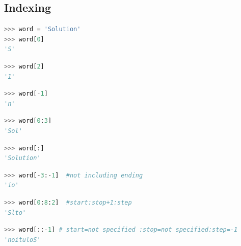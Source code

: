 \documentclass{book}
\begin{document}
    
        \subsection{Indexing}\label{indexing}
    




    
        \begin{lstlisting}[language=Python]
>>> word = 'Solution'
>>> word[0]
'S'
\end{lstlisting}
    




    
        \begin{lstlisting}[language=Python]
>>> word[2]
'1'
\end{lstlisting}
    




    
        \begin{lstlisting}[language=Python]
>>> word[-1]
'n'
\end{lstlisting}
    




    
        \begin{lstlisting}[language=Python]
>>> word[0:3]
'Sol'
\end{lstlisting}
    




    
        \begin{lstlisting}[language=Python]
>>> word[:]
'Solution'
\end{lstlisting}
    




    
        \begin{lstlisting}[language=Python]
>>> word[-3:-1]  #not including ending
'io'
\end{lstlisting}
    




    
        \begin{lstlisting}[language=Python]
>>> word[0:8:2]  #start:stop+1:step
'Slto'
\end{lstlisting}
    




    
        \begin{lstlisting}[language=Python]
>>> word[::-1] # start=not specified :stop=not specified:step=-1
'noituloS'
\end{lstlisting}
    
\end{document}

